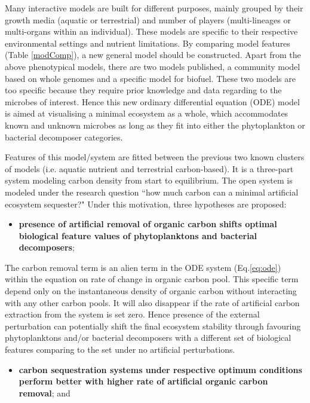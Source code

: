 \documentclass[../thesis.tex]{subfiles} %
\begin{document}
Many interactive models are built for different purposes, mainly grouped by their growth media (aquatic or terrestrial) and number of players (multi-lineages or multi-organs within an individual).  These models are specific to their respective environmental settings and nutrient limitations.  By comparing model features (Table \ref{modComp}), a new general model should be constructed.  Apart from the above phenotypical models, there are two models published, a community model based on whole genomes\autocite{harcombe2014metabolic} and a specific model for biofuel\autocite{kirthiga2014mathematical}.  These two models are too specific because they require prior knowledge and data regarding to the microbes of interest.  Hence this new ordinary differential equation (ODE) model is aimed at visualising a minimal ecosystem as a whole, which accommodates known and unknown microbes as long as they fit into either the phytoplankton or bacterial decomposer categories.

Features of this model/system are fitted between the previous two known clusters of models (i.e. aquatic nutrient and terrestrial carbon-based).  It is a three-part system modeling carbon density from start to equilibrium.  The open system is modeled under the research question ``how much carbon can a minimal artificial ecosystem sequester?"  Under this motivation, three hypotheses are proposed:
\begin{itemize}
    \item \textbf{presence of artificial removal of organic carbon shifts optimal biological feature values of phytoplanktons and bacterial decomposers};
\end{itemize}

The carbon removal term is an alien term in the ODE system (Eq.\ref{eq:ode}) within the equation on rate of change in organic carbon pool.  This specific term depend only on the instantaneous density of organic carbon without interacting with any other carbon pools.  It will also disappear if the rate of artificial carbon extraction from the system is set zero.  Hence presence of the external perturbation can potentially shift the final ecosystem stability through favouring phytoplanktons and/or bacterial decomposers with a different set of biological features comparing to the set under no artificial perturbations.

\begin{itemize}
    \item \textbf{carbon sequestration systems under respective optimum conditions perform better with higher rate of artificial organic carbon removal};
    and
\end{itemize}
\end{document}
